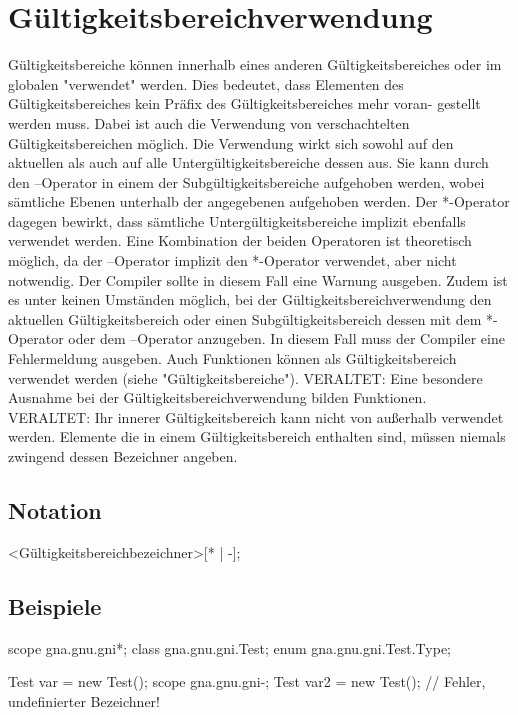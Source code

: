 \chapter{Gültigkeitsbereichverwendung}
Gültigkeitsbereiche können innerhalb eines anderen Gültigkeitsbereiches oder im globalen "verwendet" werden.
Dies bedeutet, dass Elementen des Gültigkeitsbereiches kein Präfix des Gültigkeitsbereiches mehr voran-
gestellt werden muss.
Dabei ist auch die Verwendung von verschachtelten Gültigkeitsbereichen möglich.
Die Verwendung wirkt sich sowohl auf den aktuellen als auch auf alle Untergültigkeitsbereiche dessen aus.
Sie kann durch den --Operator in einem der Subgültigkeitsbereiche aufgehoben werden, wobei sämtliche Ebenen unterhalb der angegebenen
aufgehoben werden.
Der *-Operator dagegen bewirkt, dass sämtliche Untergültigkeitsbereiche implizit ebenfalls verwendet werden.
Eine Kombination der beiden Operatoren ist theoretisch möglich, da der --Operator implizit den *-Operator verwendet, aber nicht notwendig.
Der Compiler sollte in diesem Fall eine Warnung ausgeben.
Zudem ist es unter keinen Umständen möglich, bei der Gültigkeitsbereichverwendung den aktuellen Gültigkeitsbereich oder einen Subgültigkeitsbereich
dessen mit dem *-Operator oder dem --Operator anzugeben.
In diesem Fall muss der Compiler eine Fehlermeldung ausgeben.
Auch Funktionen können als Gültigkeitsbereich verwendet werden (siehe "Gültigkeitsbereiche").
VERALTET: Eine besondere Ausnahme bei der Gültigkeitsbereichverwendung bilden Funktionen.
VERALTET: Ihr innerer Gültigkeitsbereich kann nicht von außerhalb verwendet werden.
Elemente die in einem Gültigkeitsbereich enthalten sind, müssen niemals zwingend dessen Bezeichner angeben.

\section{Notation}
<Gültigkeitsbereichbezeichner>[* | -];

\section{Beispiele}
scope gna.gnu.gni*;
class gna.gnu.gni.Test;
enum gna.gnu.gni.Test.Type;

Test var = new Test();
scope gna.gnu.gni-;
Test var2 = new Test(); // Fehler, undefinierter Bezeichner!
 
